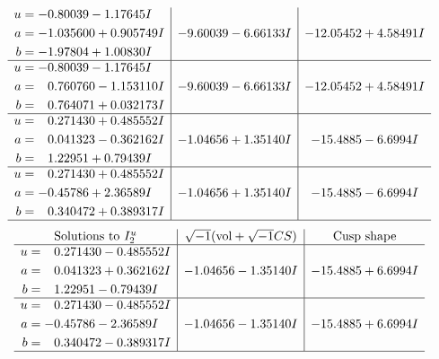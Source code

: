 \documentclass[1p]{elsarticle_modified}
\theoremstyle{definition}
\newcommand{\I}{\sqrt{-1}}
\begin{document}
$$\begin{array}{c|c|c}
\begin{aligned}
u &= -0.80039 - 1.17645 I \\
a &= -1.035600 + 0.905749 I \\
b &= -1.97804 + 1.00830 I\end{aligned}
 & -9.60039 - 6.66133 I & -12.05452 + 4.58491 I \\ \hline\begin{aligned}
u &= -0.80039 - 1.17645 I \\
a &= \phantom{-}0.760760 - 1.153110 I \\
b &= \phantom{-}0.764071 + 0.032173 I\end{aligned}
 & -9.60039 - 6.66133 I & -12.05452 + 4.58491 I \\ \hline\begin{aligned}
u &= \phantom{-}0.271430 + 0.485552 I \\
a &= \phantom{-}0.041323 - 0.362162 I \\
b &= \phantom{-}1.22951 + 0.79439 I\end{aligned}
 & -1.04656 + 1.35140 I & -15.4885 - 6.6994 I \\ \hline\begin{aligned}
u &= \phantom{-}0.271430 + 0.485552 I \\
a &= -0.45786 + 2.36589 I \\
b &= \phantom{-}0.340472 + 0.389317 I\end{aligned}
 & -1.04656 + 1.35140 I & -15.4885 - 6.6994 I\\
 \hline 
 \end{array}$$\newpage$$\begin{array}{c|c|c}  
\text{Solutions to }I^u_{2}& \I (\text{vol} + \sqrt{-1}CS) & \text{Cusp shape}\\
 \hline 
\begin{aligned}
u &= \phantom{-}0.271430 - 0.485552 I \\
a &= \phantom{-}0.041323 + 0.362162 I \\
b &= \phantom{-}1.22951 - 0.79439 I\end{aligned}
 & -1.04656 - 1.35140 I & -15.4885 + 6.6994 I \\ \hline\begin{aligned}
u &= \phantom{-}0.271430 - 0.485552 I \\
a &= -0.45786 - 2.36589 I \\
b &= \phantom{-}0.340472 - 0.389317 I\end{aligned}
 & -1.04656 - 1.35140 I & -15.4885 + 6.6994 I\\
 \hline 
 \end{array}$$\newpage\newpage\renewcommand{\arraystretch}{1}
\end{document}
